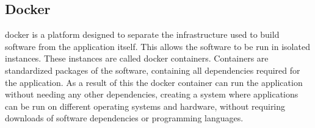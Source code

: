 \subsection{Docker}
\label{sec:docker_theory}
\gls{docker} is a platform designed to separate the infrastructure used to build software from the application itself. This allows the software to be run in isolated instances. These instances are called docker containers. Containers are standardized packages of the software, containing all dependencies required for the application. As a result of this the docker container can run the application without needing any other dependencies, creating a system where applications can be run on different operating systems and hardware, without requiring downloads of software dependencies or programming languages\parencite{docker_overview,docker_containers}.







